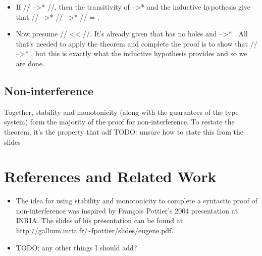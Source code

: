 \documentclass[12pt]{report}
\begin{document}
\begin{itemize}
\item  If // -->* //, then the transitivity of -->* and the
      inductive hypothesis give that // -->* // -->* //
      = .



\item  Now presume // << //. It's already given that  has
      no holes and  -->* . All that's needed to apply the
       theorem and complete the proof is to show that
      // -->* , but this is exactly what the inductive
      hypothesis provides and so we are done.

\end{itemize}




\section{Non-interference}

 Together, stability and monotonicity (along with the guarantees of the type system) form the majority of the proof for non-interference. To restate the theorem, it's the property that adf TODO: unsure how to state this from the slides

\chapter{References and Related Work}

\begin{itemize}
\item  The idea for using stability and monotonicity to complete a syntactic proof of non-interference was inspired by François Pottier's 2004 presentation at INRIA. The slides of his presentation can be found at \url{http://gallium.inria.fr/~fpottier/slides/eugene.pdf}.



\item  TODO: any other things I should add?

\end{itemize}
\end{document}
